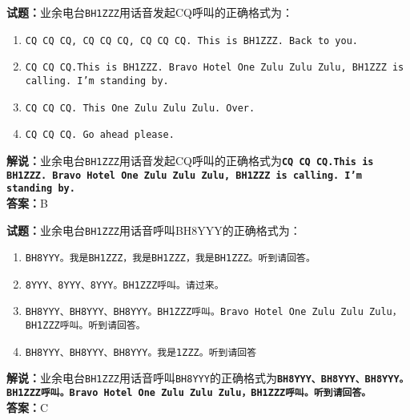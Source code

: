 \documentclass{ctexbook}
\begin{document}
\bigskip


\noindent\textbf{试题：}业余电台\texttt{BH1ZZZ}用话音发起CQ呼叫的正确格式为：
\begin{enumerate}[leftmargin=3em]
	\item \texttt{CQ CQ CQ, CQ CQ CQ, CQ CQ CQ. This is BH1ZZZ. Back to you.}
	\item \texttt{CQ CQ CQ.This is BH1ZZZ. Bravo Hotel One Zulu Zulu Zulu, BH1ZZZ is calling. I’m standing by.}
	\item \texttt{CQ CQ CQ. This One Zulu Zulu Zulu. Over.}
	\item \texttt{CQ CQ CQ. Go ahead please.}
\end{enumerate}
\noindent\textbf{解说：}业余电台\texttt{BH1ZZZ}用话音发起CQ呼叫的正确格式为\texttt{\textbf{CQ CQ CQ.This is BH1ZZZ. Bravo Hotel One Zulu Zulu Zulu, BH1ZZZ is calling. I’m standing by.}}\cite{icao}\cite[49]{yeyuwuxiandiantongxin}\\
\noindent\textbf{答案：}B


\bigskip


\noindent\textbf{试题：}业余电台\texttt{BH1ZZZ}用话音呼叫BH8YYY的正确格式为：
\begin{enumerate}[leftmargin=3em]
	\item \texttt{BH8YYY。我是BH1ZZZ，我是BH1ZZZ，我是BH1ZZZ。听到请回答。}
	\item \texttt{8YYY、8YYY、8YYY。BH1ZZZ呼叫。请过来。}
	\item \texttt{BH8YYY、BH8YYY、BH8YYY。BH1ZZZ呼叫。Bravo Hotel One Zulu Zulu Zulu，BH1ZZZ呼叫。听到请回答。}
	\item \texttt{BH8YYY、BH8YYY、BH8YYY。我是1ZZZ。听到请回答}
\end{enumerate}
\noindent\textbf{解说：}业余电台\texttt{BH1ZZZ}用话音呼叫\texttt{BH8YYY}的正确格式为\texttt{\textbf{BH8YYY、BH8YYY、BH8YYY。BH1ZZZ呼叫。Bravo Hotel One Zulu Zulu Zulu，BH1ZZZ呼叫。听到请回答。}}\cite{icao}\cite[49]{yeyuwuxiandiantongxin}\\
\noindent\textbf{答案：}C


\bigskip
\end{document}
